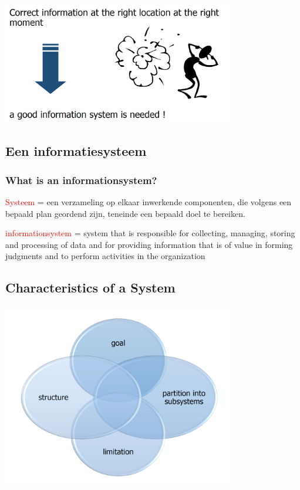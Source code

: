 \begin{center}
\includegraphics[width=4in]{img/theimportanceofinformation2}%
\end{center}

\subsection{Een informatiesysteem}

\subsubsection{What is an informationsystem?}

\textcolor{red}{Systeem} = een verzameling op elkaar inwerkende componenten, die volgens een bepaald plan geordend zijn, teneinde een bepaald doel te bereiken.

\textcolor{red}{\Gls{informationsystem}} = system that is responsible for collecting, managing, storing and processing of data and for providing information that is of value in forming judgments and to perform activities in the organization

\subsection{Characteristics of a System}

\begin{center}
            \includegraphics[width=4in]{img/osa1.PNG}
\end{center}

